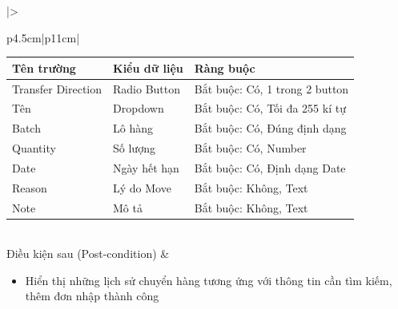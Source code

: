 \documentclass[12pt,a4paper]{report}
\begin{document}
\begin{longtable}{|>{\raggedright\arraybackslash\bfseries}p{4.5cm}|p{11cm}|}
\begin{tabular}{|p{3.5cm}|p{2.5cm}|p{4cm}|}
\hline
\textbf{Tên trường} & \textbf{Kiểu dữ liệu} & \textbf{Ràng buộc} \\ \hline
Transfer Direction & Radio Button & Bắt buộc: Có, 1 trong 2 button \\ \hline
Tên & Dropdown & Bắt buộc: Có, Tối đa 255 kí tự \\ \hline
Batch & Lô hàng & Bắt buộc: Có, Đúng định dạng \\ \hline
Quantity & Số lượng & Bắt buộc: Có, Number \\ \hline
Date & Ngày hết hạn & Bắt buộc: Có, Định dạng Date \\ \hline
Reason & Lý do Move & Bắt buộc: Không, Text \\ \hline
Note & Mô tả & Bắt buộc: Không, Text \\ \hline
\end{tabular} \\ \hline
Điều kiện sau (Post-condition) & 
\begin{itemize}[leftmargin=*, nosep, topsep=0pt, partopsep=0pt]
    \item Hiển thị những lịch sử chuyển hàng tương ứng với thông tin cần tìm kiếm, thêm đơn nhập thành công
\end{itemize} \\ \hline
\end{longtable}

\vspace{0.5cm}
\end{document}
